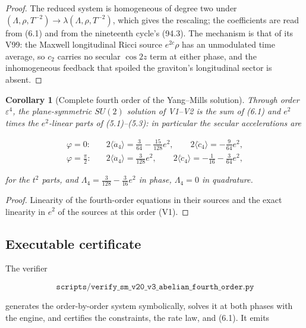 \documentclass[11pt]{article}
\newtheorem{corollary}[theorem]{Corollary}
\theoremstyle{remark}
\begin{document}
\begin{proof}
The reduced system is homogeneous of degree two under
\((\Lambda,\rho,T^{-2})\to\lambda(\Lambda,\rho,T^{-2})\), which gives the
rescaling; the coefficients are read from (6.1) and from the
nineteenth cycle's (94.3).  The mechanism is that of its V99: the
Maxwell longitudinal Ricci source \(e^{2c}\rho\) has an unmodulated
time average, so \(c_2\) carries no secular \(\cos2z\) term at either
phase, and the inhomogeneous feedback that spoiled the graviton's
longitudinal sector is absent.
\end{proof}

\begin{corollary}[Complete fourth order of the Yang--Mills solution]
\label{cor:v20v3-complete}
Through order \(\varepsilon^4\), the plane-symmetric \(SU(2)\)
solution of V1--V2 is the sum of (6.1) and \(e^2\) times the
\(e^2\)-linear parts of (5.1)--(5.3): in particular the secular
accelerations are

\[
\begin{aligned}
 \varphi=0:&\quad 2\langle\ddot a_4\rangle=\frac3{64}-\frac{15}{128}e^2,\qquad
           2\langle\ddot c_4\rangle=-\frac9{64}e^2,\\
 \varphi=\tfrac\pi2:&\quad 2\langle\ddot a_4\rangle=\frac3{128}e^2,\qquad
           2\langle\ddot c_4\rangle=-\frac1{16}-\frac3{64}e^2,
\end{aligned}                                                          \tag{6.2}
\]

for the \(t^2\) parts, and \(\Lambda_4=\tfrac3{128}-\tfrac3{16}e^2\) in
phase, \(\Lambda_4=0\) in quadrature.
\end{corollary}

\begin{proof}
Linearity of the fourth-order equations in their sources and the
exact linearity in \(e^2\) of the sources at this order (V1).
\end{proof}

\subsection{Executable certificate}

The verifier

\[
 \texttt{scripts/verify\_sm\_v20\_v3\_abelian\_fourth\_order.py}       \tag{6.3}
\]

generates the order-by-order system symbolically, solves it at both
phases with the engine, and certifies the constraints, the rate law,
and (6.1).  It emits
\end{document}
